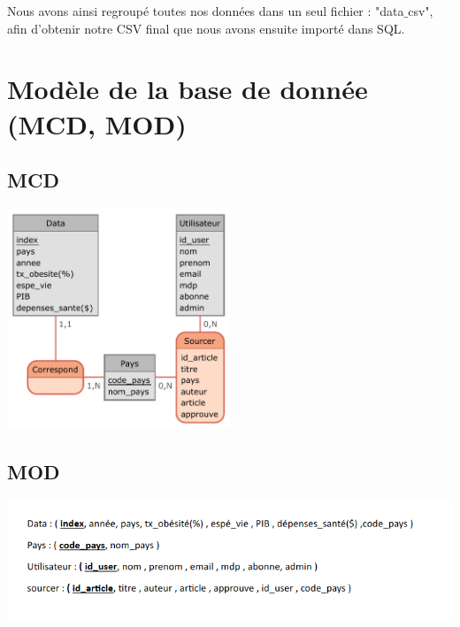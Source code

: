\documentclass[12pt,a4paper]{report}
\begin{document}
    Nous avons ainsi regroupé toutes nos données dans un seul fichier : "data$\_$csv", afin d'obtenir notre CSV final que nous avons ensuite importé dans SQL.
    
\section{Modèle de la base de donnée (MCD, MOD)}
\subsection{MCD}
    \begin{center}
        \includegraphics[width=0.5\textwidth]{images/Pays-2.pdf}
    \end{center}
\subsection{MOD}
    \begin{center}
        \includegraphics[width=1.1\textwidth]{images/mod.png}
    \end{center}
\end{document}

